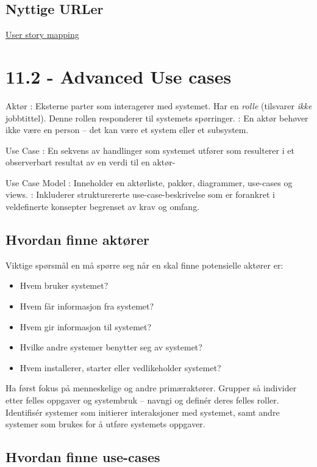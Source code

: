 \subsection{Nyttige URLer}

\href{http://www.agileproductdesign.com/presentations/user\_story\_mapping/index.html}{User
story mapping}

\section{11.2 - Advanced Use cases}

Aktør : Eksterne parter som interagerer med systemet. Har en
\emph{rolle} (tilsvarer \emph{ikke} jobbtittel). Denne rollen
responderer til systemets spørringer. : En aktør behøver ikke være en
person -- det kan være et system eller et subsystem.

Use Case : En sekvens av handlinger som systemet utfører som resulterer
i et observerbart resultat av en verdi til en aktør-

Use Case Model : Inneholder en aktørliste, pakker, diagrammer, use-cases
og views. : Inkluderer strukturererte use-case-beskrivelse som er
forankret i veldefinerte konsepter begrenset av krav og omfang.

\subsection{Hvordan finne aktører}

Viktige spørsmål en må spørre seg når en skal finne potensielle aktører
er:

\begin{itemize}
\item
  Hvem bruker systemet?
\item
  Hvem får informasjon fra systemet?
\item
  Hvem gir informasjon til systemet?
\item
  Hvilke andre systemer benytter seg av systemet?
\item
  Hvem installerer, starter eller vedlikeholder systemet?
\end{itemize}
Ha først fokus på menneskelige og andre primæraktører. Grupper så
individer etter felles oppgaver og systembruk -- navngi og definér deres
felles roller. Identifisér systemer som initierer interaksjoner med
systemet, samt andre systemer som brukes for å utføre systemets
oppgaver.

\subsection{Hvordan finne use-cases}

